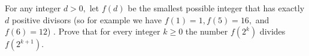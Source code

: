 For any integer 
$d > 0,$
 let 
$f(d)$
 be the smallest possible integer that has exactly 
$d$
 positive divisors (so for example we have 
$f(1)=1, f(5)=16,$
 and 
$f(6)=12$)
. Prove that for every integer 
$k \geq 0$
 the number 
$f\left(2^k\right)$
 divides 
$f\left(2^{k+1}\right).$
